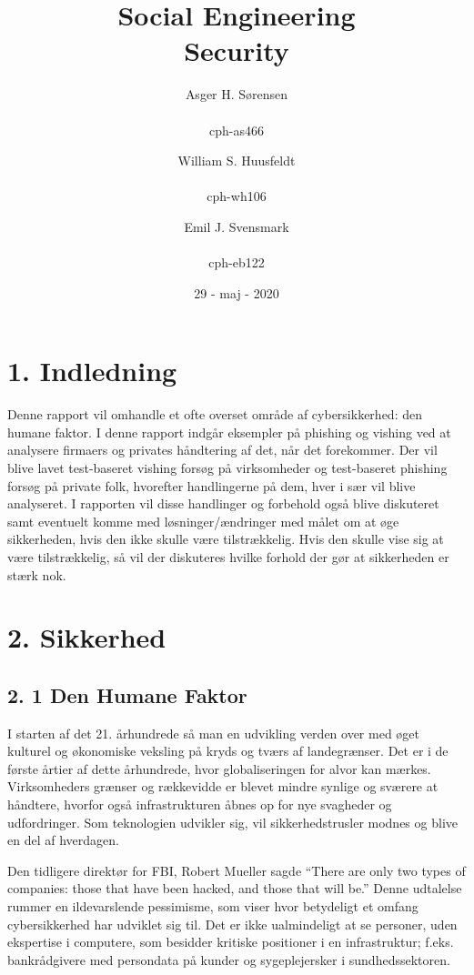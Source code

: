 \documentclass[11pt]{report}
\title{Social Engineering\\Security}
\author{
Asger H. Sørensen\\
\\cph-as466
\and
William S. Huusfeldt\\
\\cph-wh106
\and
Emil J. Svensmark\\
\\cph-eb122
}
\date{29 - maj - 2020}
\begin{document}
\maketitle
\renewcommand{\cftchapleader}{\cftdotfill{\cftdotsep}}
\tableofcontents
\newpage

\chapter*{1. Indledning}
Denne rapport vil omhandle et ofte overset område af cybersikkerhed: den humane faktor. I denne rapport indgår eksempler på phishing og vishing ved at analysere firmaers og privates håndtering af det, når det forekommer. Der vil blive lavet test-baseret vishing forsøg på virksomheder og test-baseret phishing forsøg på private folk, hvorefter handlingerne på dem, hver i sær vil blive analyseret. I rapporten vil disse handlinger og forbehold også blive diskuteret samt eventuelt komme med løsninger/ændringer med målet om at øge sikkerheden, hvis den ikke skulle være tilstrækkelig. Hvis den skulle vise sig at være tilstrækkelig, så vil der diskuteres hvilke forhold der gør at sikkerheden er stærk nok. 

\chapter*{2. Sikkerhed}

\section*{2. 1 Den Humane Faktor}
I starten af det 21. århundrede så man en udvikling verden over med øget kulturel og økonomiske veksling på kryds og tværs af landegrænser. Det er i de første årtier af dette århundrede, hvor globaliseringen for alvor kan mærkes. Virksomheders grænser og rækkevidde er blevet mindre synlige og sværere at håndtere, hvorfor også infrastrukturen åbnes op for nye svagheder og udfordringer. Som teknologien udvikler sig, vil sikkerhedstrusler modnes og blive en del af hverdagen.

Den tidligere direktør for FBI, Robert Mueller sagde “There are only two types of companies: those that have been hacked, and those that will be.” Denne udtalelse rummer en ildevarslende pessimisme, som viser hvor betydeligt et omfang cybersikkerhed har udviklet sig til. Det er ikke ualmindeligt at se personer, uden ekspertise i computere, som besidder kritiske positioner i en infrastruktur; f.eks. bankrådgivere med persondata på kunder og sygeplejersker i sundhedssektoren.
\end{document}
